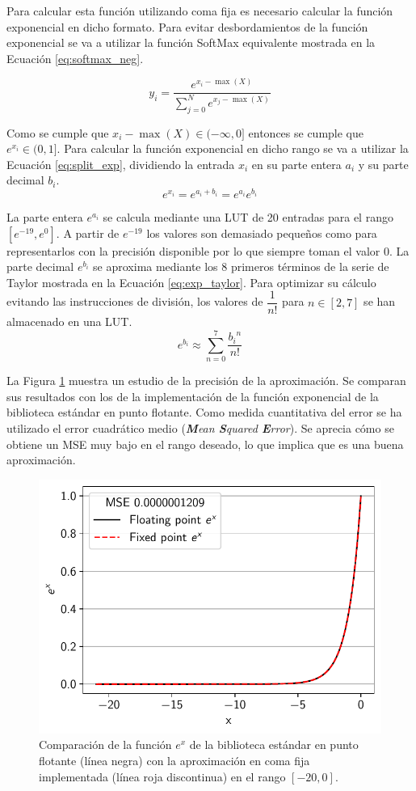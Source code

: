 Para calcular esta función utilizando coma fija es necesario calcular la función exponencial en dicho formato. Para evitar desbordamientos de la función exponencial se va a utilizar la función SoftMax equivalente mostrada en la Ecuación \ref{eq:softmax_neg}.

\begin{equation} \label{eq:softmax_neg}
y_i = \dfrac{e^{x_i - \max(X)}}{\sum_{j = 0}^N e^{x_j - \max(X)}}
\end{equation}

Como se cumple que $x_i - \max(X) \in (-\infty, 0]$ entonces se cumple que $e^{x_i} \in (0,1]$. Para calcular la función exponencial en dicho rango se va a utilizar la Ecuación \ref{eq:split_exp}, dividiendo la entrada $x_i$ en su parte entera $a_i$ y su parte decimal $b_i$.
\begin{equation} \label{eq:split_exp}
e^{x_i} = e^{a_i+b_i} = e^{a_i} e^{b_i}
\end{equation}

La parte entera $e^{a_i}$ se calcula mediante una LUT de 20 entradas para el rango $[e^{-19}, e^{0}]$. A partir de $e^{-19}$ los valores son demasiado pequeños como para representarlos con la precisión disponible por lo que siempre toman el valor $0$. La parte decimal $e^{b_i}$ se aproxima mediante los 8 primeros términos de la serie de Taylor mostrada en la Ecuación \ref{eq:exp_taylor}. Para optimizar su cálculo evitando las instrucciones de división, los valores de $\dfrac{1}{n!}$ para $n \in [2,7]$ se han almacenado en una LUT.
\begin{equation} \label{eq:exp_taylor}
e^{b_i} \approx \sum_{n=0}^{7} \dfrac{{b_i}^n}{n!}
\end{equation}

La Figura \ref{fig:exp_aprox} muestra un estudio de la precisión de la aproximación. Se comparan sus resultados con los de la implementación de la función exponencial de la biblioteca estándar en punto flotante. Como medida cuantitativa del error se ha utilizado el error cuadrático medio (\textit{\textbf{M}ean \textbf{S}quared \textbf{E}rror}). Se aprecia cómo se obtiene un MSE muy bajo en el rango deseado, lo que implica que es una buena aproximación.

\begin{figure}[h]
	\centering
	\includegraphics[width=0.55\linewidth]{root/Imagenes/bnn_lib/exp_aprox.pdf}
	\caption{Comparación de la función $e^x$ de la biblioteca estándar en punto flotante (línea negra) con la aproximación en coma fija implementada (línea roja discontinua) en el rango $[-20,0]$.}
	\label{fig:exp_aprox}
\end{figure}

